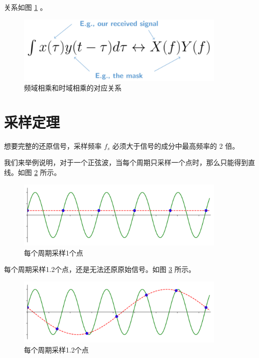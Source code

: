 \documentclass[lang=cn,newtx,10pt,scheme=chinese]{elegantbook}
\begin{document}
关系如图 \ref{fig:xfyf} 。

\begin{figure}[!htb]
\centering
\includegraphics[width=0.9\textwidth]{xfyf.pdf}
\caption{频域相乘和时域相乘的对应关系}
\label{fig:xfyf}
\end{figure}

\section{采样定理}

\begin{theorem}[采样定理]
    想要完整的还原信号，采样频率 $f_s$ 必须大于信号的成分中最高频率的 2 倍。
\end{theorem}

我们来举例说明，对于一个正弦波，当每个周期只采样一个点时，那么只能得到直线。如图 \ref{fig:sampling_Fs_0.3} 所示。

\begin{figure}[!htb]
\centering
\includegraphics[width=0.9\textwidth]{sampling_Fs_0.3.pdf}
\caption{每个周期采样1个点}
\label{fig:sampling_Fs_0.3}
\end{figure}

每个周期采样1.2个点，还是无法还原原始信号。如图 \ref{fig:sampling_Fs_0.36} 所示。

\begin{figure}[!htb]
\centering
\includegraphics[width=0.9\textwidth]{sampling_Fs_0.36.pdf}
\caption{每个周期采样1.2个点}
\label{fig:sampling_Fs_0.36}
\end{figure}
\end{document}
